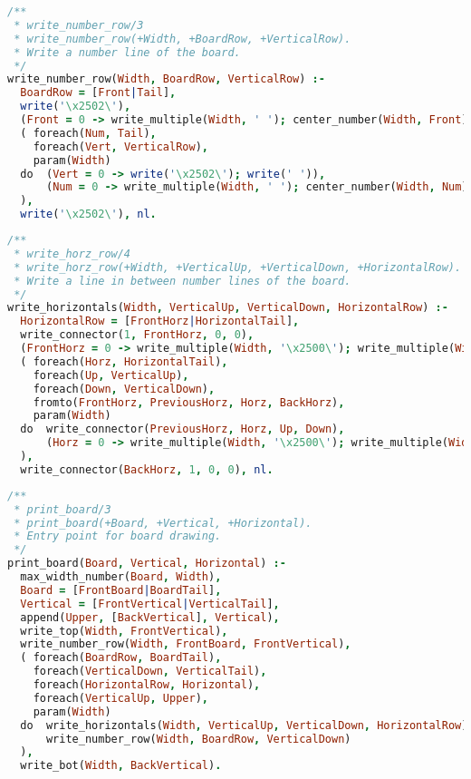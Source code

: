 \documentclass[runningheads]{llncs}
\begin{document}
\begin{center}
\begin{minipage}{0.85\textwidth}
\centering\ttfamily
\begin{lstlisting}[language=Prolog]
/**
 * write_number_row/3
 * write_number_row(+Width, +BoardRow, +VerticalRow).
 * Write a number line of the board.
 */
write_number_row(Width, BoardRow, VerticalRow) :-
  BoardRow = [Front|Tail],
  write('\x2502\'),
  (Front = 0 -> write_multiple(Width, ' '); center_number(Width, Front)),
  ( foreach(Num, Tail),
    foreach(Vert, VerticalRow),
    param(Width)
  do  (Vert = 0 -> write('\x2502\'); write(' ')),
      (Num = 0 -> write_multiple(Width, ' '); center_number(Width, Num))
  ),
  write('\x2502\'), nl.
\end{lstlisting}
\end{minipage}
\end{center}
  
\begin{center}
\begin{minipage}{0.85\textwidth}
\centering\ttfamily
\begin{lstlisting}[language=Prolog]
/**
 * write_horz_row/4
 * write_horz_row(+Width, +VerticalUp, +VerticalDown, +HorizontalRow).
 * Write a line in between number lines of the board.
 */
write_horizontals(Width, VerticalUp, VerticalDown, HorizontalRow) :-
  HorizontalRow = [FrontHorz|HorizontalTail],
  write_connector(1, FrontHorz, 0, 0),
  (FrontHorz = 0 -> write_multiple(Width, '\x2500\'); write_multiple(Width, ' ')),
  ( foreach(Horz, HorizontalTail),
    foreach(Up, VerticalUp),
    foreach(Down, VerticalDown),
    fromto(FrontHorz, PreviousHorz, Horz, BackHorz),
    param(Width)
  do  write_connector(PreviousHorz, Horz, Up, Down),
      (Horz = 0 -> write_multiple(Width, '\x2500\'); write_multiple(Width, ' '))
  ),
  write_connector(BackHorz, 1, 0, 0), nl.
\end{lstlisting}
\end{minipage}
\end{center}

\begin{center}
\begin{minipage}{0.85\textwidth}
\centering\ttfamily
\begin{lstlisting}[language=Prolog]
/**
 * print_board/3
 * print_board(+Board, +Vertical, +Horizontal).
 * Entry point for board drawing.
 */
print_board(Board, Vertical, Horizontal) :-
  max_width_number(Board, Width),
  Board = [FrontBoard|BoardTail],
  Vertical = [FrontVertical|VerticalTail],
  append(Upper, [BackVertical], Vertical),
  write_top(Width, FrontVertical),
  write_number_row(Width, FrontBoard, FrontVertical),
  ( foreach(BoardRow, BoardTail),
    foreach(VerticalDown, VerticalTail),
    foreach(HorizontalRow, Horizontal),
    foreach(VerticalUp, Upper),
    param(Width)
  do  write_horizontals(Width, VerticalUp, VerticalDown, HorizontalRow),
      write_number_row(Width, BoardRow, VerticalDown)
  ),
  write_bot(Width, BackVertical).

\end{lstlisting}
\end{minipage}
\end{center}
\end{document}
